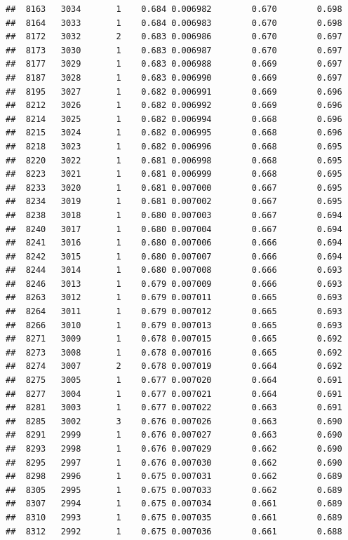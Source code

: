\documentclass[
]{book}
\begin{document}
\begin{verbatim}
##  8163   3034       1    0.684 0.006982        0.670        0.698
##  8164   3033       1    0.684 0.006983        0.670        0.698
##  8172   3032       2    0.683 0.006986        0.670        0.697
##  8173   3030       1    0.683 0.006987        0.670        0.697
##  8177   3029       1    0.683 0.006988        0.669        0.697
##  8187   3028       1    0.683 0.006990        0.669        0.697
##  8195   3027       1    0.682 0.006991        0.669        0.696
##  8212   3026       1    0.682 0.006992        0.669        0.696
##  8214   3025       1    0.682 0.006994        0.668        0.696
##  8215   3024       1    0.682 0.006995        0.668        0.696
##  8218   3023       1    0.682 0.006996        0.668        0.695
##  8220   3022       1    0.681 0.006998        0.668        0.695
##  8223   3021       1    0.681 0.006999        0.668        0.695
##  8233   3020       1    0.681 0.007000        0.667        0.695
##  8234   3019       1    0.681 0.007002        0.667        0.695
##  8238   3018       1    0.680 0.007003        0.667        0.694
##  8240   3017       1    0.680 0.007004        0.667        0.694
##  8241   3016       1    0.680 0.007006        0.666        0.694
##  8242   3015       1    0.680 0.007007        0.666        0.694
##  8244   3014       1    0.680 0.007008        0.666        0.693
##  8246   3013       1    0.679 0.007009        0.666        0.693
##  8263   3012       1    0.679 0.007011        0.665        0.693
##  8264   3011       1    0.679 0.007012        0.665        0.693
##  8266   3010       1    0.679 0.007013        0.665        0.693
##  8271   3009       1    0.678 0.007015        0.665        0.692
##  8273   3008       1    0.678 0.007016        0.665        0.692
##  8274   3007       2    0.678 0.007019        0.664        0.692
##  8275   3005       1    0.677 0.007020        0.664        0.691
##  8277   3004       1    0.677 0.007021        0.664        0.691
##  8281   3003       1    0.677 0.007022        0.663        0.691
##  8285   3002       3    0.676 0.007026        0.663        0.690
##  8291   2999       1    0.676 0.007027        0.663        0.690
##  8293   2998       1    0.676 0.007029        0.662        0.690
##  8295   2997       1    0.676 0.007030        0.662        0.690
##  8298   2996       1    0.675 0.007031        0.662        0.689
##  8305   2995       1    0.675 0.007033        0.662        0.689
##  8307   2994       1    0.675 0.007034        0.661        0.689
##  8310   2993       1    0.675 0.007035        0.661        0.689
##  8312   2992       1    0.675 0.007036        0.661        0.688

\end{verbatim}
\end{document}
